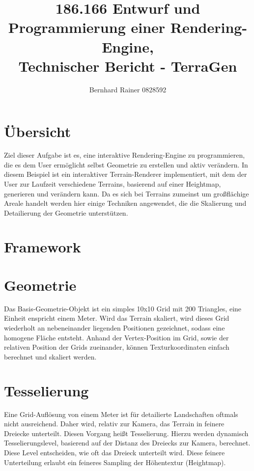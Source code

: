 \documentclass[a4paper,10pt]{article}
\begin{document}
\author{Bernhard Rainer 0828592 \\
	}

\title{186.166 Entwurf und Programmierung einer Rendering-Engine,\\
	Technischer Bericht - TerraGen}

\maketitle

\section*{Übersicht}
Ziel dieser Aufgabe ist es, eine interaktive Rendering-Engine zu programmieren, die es dem User ermöglicht selbst Geometrie zu erstellen und aktiv verändern. In diesem Beispiel ist ein interaktiver Terrain-Renderer implementiert, mit dem der User zur Laufzeit verschiedene Terrains, basierend auf einer Heightmap, generieren und verändern kann. 
Da es sich bei Terrains zumeinst um großflächige Areale handelt werden hier einige Techniken angewendet, die die Skalierung und Detailierung der Geometrie unterstützen. 

\section*{Framework}

\section*{Geometrie}
Das Basis-Geometrie-Objekt ist ein simples 10x10 Grid mit 200 Triangles, eine Einheit enspricht einem Meter. Wird das Terrain skaliert, wird dieses Grid wiederholt an nebeneinander liegenden Positionen gezeichnet, sodass eine homogene Fläche entsteht. Anhand der Vertex-Position im Grid, sowie der relativen Position der Grids zueinander, können Texturkoordinaten einfach berechnet und skaliert werden. 

\section*{Tesselierung}
Eine Grid-Auflösung von einem Meter ist für detailierte Landschaften oftmals nicht ausreichend. Daher wird, relativ zur Kamera, das Terrain in feinere Dreiecke unterteilt. Diesen Vorgang heißt Tesselierung. Hierzu werden dynamisch  Tesselierungslevel, basierend auf der Distanz des Dreiecks zur Kamera, berechnet. Diese Level entscheiden, wie oft das Dreieck unterteilt wird. Diese feinere Unterteilung erlaubt ein feineres Sampling der Höhentextur (Heightmap). 
\end{document}

